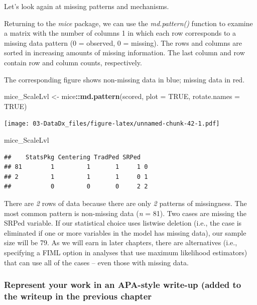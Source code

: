 \documentclass[
  11pt,
]{book}
\newenvironment{Shaded}{\begin{snugshade}}{\end{snugshade}}
\newcommand{\AttributeTok}[1]{\textcolor[rgb]{0.27,0.27,0.27}{#1}}
\newcommand{\ConstantTok}[1]{\textcolor[rgb]{0.37,0.37,0.37}{#1}}
\newcommand{\FunctionTok}[1]{\textcolor[rgb]{0.27,0.27,0.27}{\textbf{#1}}}
\newcommand{\NormalTok}[1]{#1}
\newcommand{\OtherTok}[1]{\textcolor[rgb]{0.37,0.37,0.37}{#1}}
\newcommand{\SpecialCharTok}[1]{\textcolor[rgb]{0.43,0.43,0.43}{\textbf{#1}}}
\begin{document}
Let's look again at missing patterns and mechanisms.

Returning to the \emph{mice} package, we can use the \emph{md.pattern()} function to examine a matrix with the number of columns 1 in which each row corresponds to a missing data pattern (0 = observed, 0 = missing). The rows and columns are sorted in increasing amounts of missing information. The last column and row contain row and column counts, respectively.

The corresponding figure shows non-missing data in blue; missing data in red.

\begin{Shaded}
\begin{Highlighting}[]
\NormalTok{mice\_ScaleLvl }\OtherTok{\textless{}{-}}\NormalTok{ mice}\SpecialCharTok{::}\FunctionTok{md.pattern}\NormalTok{(scored, }\AttributeTok{plot =} \ConstantTok{TRUE}\NormalTok{, }\AttributeTok{rotate.names =} \ConstantTok{TRUE}\NormalTok{)}
\end{Highlighting}
\end{Shaded}

\texttt{[image: 03-DataDx\_files/figure-latex/unnamed-chunk-42-1.pdf]}

\begin{Shaded}
\begin{Highlighting}[]
\NormalTok{mice\_ScaleLvl}
\end{Highlighting}
\end{Shaded}

\begin{verbatim}
##    StatsPkg Centering TradPed SRPed  
## 81        1         1       1     1 0
## 2         1         1       1     0 1
##           0         0       0     2 2
\end{verbatim}

There are \emph{2} rows of data because there are only \emph{2} patterns of missingness. The most common pattern is non-missing data (\emph{n} = 81). Two cases are missing the SRPed variable. If our statistical choice uses listwise deletion (i.e., the case is eliminated if one or more variables in the model has missing data), our sample size will be 79. As we will earn in later chapters, there are alternatives (i.e., specifying a FIML option in analyses that use maximum likelihood estimators) that can use all of the cases -- even those with missing data.

\hypertarget{represent-your-work-in-an-apa-style-write-up-added-to-the-writeup-in-the-previous-chapter}{%
\subsubsection*{Represent your work in an APA-style write-up (added to the writeup in the previous chapter}\label{represent-your-work-in-an-apa-style-write-up-added-to-the-writeup-in-the-previous-chapter}}
\end{document}

